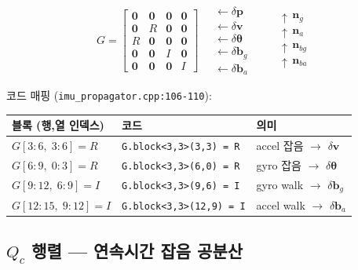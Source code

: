\documentclass[11pt,a4paper,oneside]{report}
\begin{document}
\begin{equation}
\boxed{
G = \begin{bmatrix}
\bm{0} & \bm{0} & \bm{0} & \bm{0} \\[3pt]
\bm{0} & R      & \bm{0} & \bm{0} \\[3pt]
R      & \bm{0} & \bm{0} & \bm{0} \\[3pt]
\bm{0} & \bm{0} & I      & \bm{0} \\[3pt]
\bm{0} & \bm{0} & \bm{0} & I
\end{bmatrix}
}
\quad
\begin{array}{l}
\leftarrow \delta\bm{p} \\
\leftarrow \delta\bm{v} \\
\leftarrow \delta\bm{\theta} \\
\leftarrow \delta\bm{b}_g \\
\leftarrow \delta\bm{b}_a
\end{array}
\qquad
\begin{array}{l}
\uparrow\,\bm{n}_g \\
\uparrow\,\bm{n}_a \\
\uparrow\,\bm{n}_{bg} \\
\uparrow\,\bm{n}_{ba}
\end{array}
\end{equation}

코드 매핑 (\texttt{imu\_propagator.cpp:106-110}):
\begin{center}\small
\begin{tabular}{lll}
\toprule
블록 (행,열 인덱스) & 코드 & 의미 \\
\midrule
\(G[3:6,\; 3:6]=R\)   & \texttt{G.block<3,3>(3,3)  = R} & accel 잡음 \(\to\) \(\delta\bm{v}\) \\
\(G[6:9,\; 0:3]=R\)   & \texttt{G.block<3,3>(6,0)  = R} & gyro 잡음 \(\to\) \(\delta\bm{\theta}\) \\
\(G[9:12,\; 6:9]=I\)  & \texttt{G.block<3,3>(9,6)  = I} & gyro walk \(\to\) \(\delta\bm{b}_g\) \\
\(G[12:15,\;9:12]=I\) & \texttt{G.block<3,3>(12,9) = I} & accel walk \(\to\) \(\delta\bm{b}_a\) \\
\bottomrule
\end{tabular}
\end{center}

\subsection{\(Q_c\) 행렬 — 연속시간 잡음 공분산}
\end{document}
